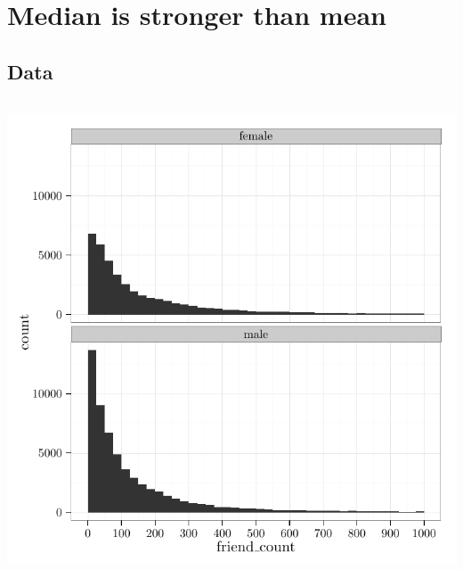 \documentclass{article}
\begin{document}
\section{Median is stronger than mean}

\subsection{Data}

\begin{center}
  \inputminted{R}{data/data.R}
\end{center}

\includegraphics{figures/friends.pdf}
\end{document}
